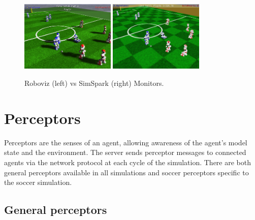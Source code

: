 \begin{figure}[t!] 
  \begin{center}
    \includegraphics[width=0.4\textwidth]{Chapter2/figures/RobovizMonitor.png}
    \includegraphics[width=0.4\textwidth]{Chapter2/figures/SimSparkMonitor.png}
  \end{center}
  \caption{Roboviz (left) vs SimSpark (right) Monitors.}
  \label{fig:Roboviz}
\end{figure}





\section{Perceptors}
Perceptors are the senses of an agent, allowing awareness of the agent's model state and the environment.
The server sends perceptor messages to connected agents via the network protocol at each cycle of the simulation.
There are both general perceptors available in all simulations and soccer perceptors specific to the soccer simulation.



\subsection{General perceptors}

